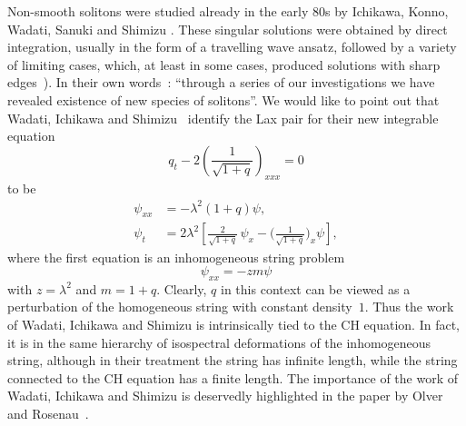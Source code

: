 \documentclass[10pt,a4paper]{article} \pdfoutput=1 
\begin{document}
Non-smooth solitons were studied already
in the early 80s by Ichikawa, Konno, Wadati, Sanuki and Shimizu
\cite{ichikawa-konno-wadati-sanuki:1980:spiky-soliton-circular-polarized-alfven-wave,
  wadati-ichikawa-shimizu:1980:cusp-soliton-new-integrable-nonlinear-evolution-equation,
  konno-ichikawa-wadati:1981:loop-soliton-propagating-along-stretched-rope,
  ichikawa-konno-wadati:1981:nonlinear-transverse-oscillation-of-elastic-beams-under-tension,
  ichikawa-konno-wadati:1983:new-integrable-nonlinear-evolution-equations-exotic-solitons}.
These singular solutions were obtained by direct integration,
usually in the form of a travelling wave ansatz,
followed by a variety of limiting cases, which, at least in some cases,
produced solutions with sharp edges~\cite[Figure 5]{ichikawa-konno-wadati:1981:nonlinear-transverse-oscillation-of-elastic-beams-under-tension}).
In their own words~\cite{ichikawa-konno-wadati:1981:nonlinear-transverse-oscillation-of-elastic-beams-under-tension}:
``through a series of our investigations we have revealed existence of new species of solitons''.
We would like to point out that Wadati, Ichikawa and Shimizu~\cite[Sect.~2]{wadati-ichikawa-shimizu:1980:cusp-soliton-new-integrable-nonlinear-evolution-equation}
identify the Lax pair for their new integrable equation
\begin{equation}
  q_t - 2 \left( \frac{1}{\sqrt{1+q}} \right)_{xxx} = 0
\end{equation}
to be
\begin{equation}
  \begin{aligned}
    \psi_{xx} &= - \lambda^2 (1+q) \psi
    ,\\
    \psi_t &= 2 \lambda^2 \left[ \frac{2}{\sqrt{1+q}} \, \psi_x - \Biggl( \frac{1}{\sqrt{1+q}} \Biggl)_x \psi \right]
    ,
  \end{aligned}
\end{equation}
where the first equation is an inhomogeneous string problem
\begin{equation*}
  \psi_{xx} = -z m \psi
\end{equation*}
with $z = \lambda^2$ and $m = 1+q$.
Clearly, $q$ in this context can be viewed as a perturbation of the homogeneous string
with constant density~$1$.
Thus the work of Wadati, Ichikawa and Shimizu is intrinsically tied to the CH equation.
In fact, it is in the same hierarchy of isospectral deformations of the inhomogeneous string,
although in their treatment the string has infinite length,
while the string connected to the CH equation has a finite length.
The importance of the work of Wadati, Ichikawa and Shimizu is deservedly highlighted
in the paper by Olver and Rosenau~\cite{olver-rosenau:1996:trihamiltonian-duality-solitons-compact-support}.
\end{document}
